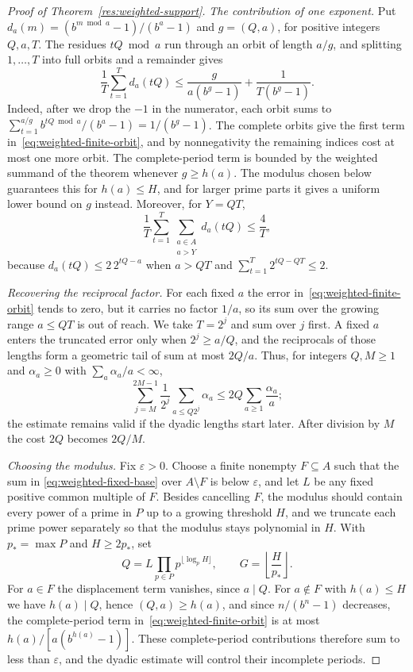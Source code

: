 \documentclass[11pt]{article}
\begin{document}
\begin{proof}[Proof of Theorem~\ref{res:weighted-support}]
\emph{The contribution of one exponent.}
Put $d_a(m)=(b^{m\bmod a}-1)/(b^a-1)$ and $g=(Q,a)$, for positive
integers $Q,a,T$. The residues $tQ\bmod a$ run through an orbit of
length $a/g$, and splitting $1,\ldots,T$ into full orbits and a
remainder gives
\begin{equation}\label{eq:weighted-finite-orbit}
 \frac1T\sum_{t=1}^T d_a(tQ)
 \le \frac{g}{a(b^g-1)}+\frac1{T(b^g-1)}.
\end{equation}
Indeed, after we drop the $-1$ in the numerator, each orbit sums to
$\sum_{t=1}^{a/g}b^{tQ\bmod a}/(b^a-1)=1/(b^g-1)$. The complete orbits
give the first term in~\eqref{eq:weighted-finite-orbit}, and by
nonnegativity the remaining indices cost at most one more orbit.
The complete-period term is bounded by the weighted summand of the
theorem whenever $g\ge h(a)$. The modulus chosen below guarantees this
for $h(a)\le H$, and for larger prime parts it gives a uniform lower
bound on $g$ instead. Moreover, for $Y=QT$,
\begin{equation}\label{eq:weighted-outer-short}
 \frac1T\sum_{t=1}^T\sum_{\substack{a\in A\\a>Y}}d_a(tQ)
 \le\frac4T,
\end{equation}
because $d_a(tQ)\le2\,2^{tQ-a}$ when $a>QT$ and
$\sum_{t=1}^T2^{tQ-QT}\le2$.

\emph{Recovering the reciprocal factor.}
For each fixed $a$ the error in~\eqref{eq:weighted-finite-orbit} tends
to zero, but it carries no factor $1/a$, so its sum over the growing
range $a\le QT$ is out of reach. We take $T=2^j$ and sum over $j$
first. A fixed $a$ enters the truncated error only when $2^j\ge a/Q$,
and the reciprocals of those lengths form a geometric tail of sum at
most $2Q/a$. Thus, for integers $Q,M\ge1$ and $\alpha_a\ge0$ with
$\sum_a\alpha_a/a<\infty$,
\begin{equation}\label{eq:weighted-dyadic-short}
 \sum_{j=M}^{2M-1}\frac1{2^j}\sum_{a\le Q2^j}\alpha_a
 \le2Q\sum_{a\ge1}\frac{\alpha_a}{a};
\end{equation}
the estimate remains valid if the dyadic lengths start later. After
division by $M$ the cost $2Q$ becomes $2Q/M$.

\emph{Choosing the modulus.}
Fix $\varepsilon>0$. Choose a finite nonempty $F\subseteq A$ such that
the sum in \eqref{eq:weighted-fixed-base} over $A\setminus F$ is below
$\varepsilon$, and let $L$ be any fixed positive common multiple of
$F$. Besides cancelling $F$, the modulus should contain every power of
a prime in $P$ up to a growing threshold $H$, and we truncate each
prime power separately so that the modulus stays polynomial in $H$.
With $p_*=\max P$ and $H\ge2p_*$, set
\[
 Q=L\prod_{p\in P}p^{\lfloor\log_pH\rfloor},\qquad
 G=\left\lfloor\frac H{p_*}\right\rfloor.
\]
For $a\in F$ the displacement term vanishes, since $a\mid Q$.
For $a\notin F$ with $h(a)\le H$ we have $h(a)\mid Q$, hence
$(Q,a)\ge h(a)$, and since $n/(b^n-1)$ decreases, the complete-period
term in~\eqref{eq:weighted-finite-orbit} is at most
$h(a)/[a(b^{h(a)}-1)]$. These complete-period contributions therefore
sum to less than $\varepsilon$, and the dyadic estimate will control
their incomplete periods.


\end{proof}
\end{document}
